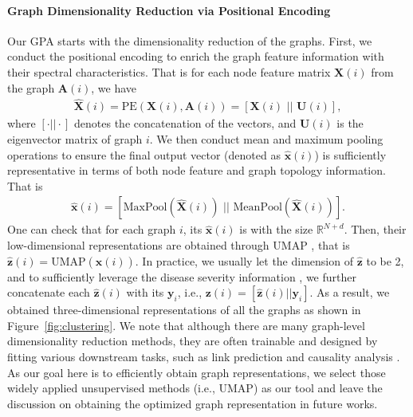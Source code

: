 \documentclass{article} %
\begin{document}
\paragraph{Graph Dimensionality Reduction via Positional Encoding}
Our GPA starts with the dimensionality reduction of the graphs. First, we conduct the positional encoding to enrich the graph feature information with their spectral characteristics. That is for each node feature matrix $\mathbf X(i)$ from the graph $\mathbf A(i)$, we have 
\begin{align}
    \widehat{\mathbf X}(i) = \mathrm{PE}(\mathbf X(i), \mathbf A(i)) = [\mathbf X(i) \,\, || \,\, \mathbf U(i)],
\end{align}
where $[\cdot || \cdot]$ denotes the concatenation of the vectors, and $\mathbf U(i)$ is the eigenvector matrix of graph $i$. We then conduct mean and maximum pooling operations to ensure the final output vector (denoted as $\widehat{\mathbf x}(i)$) is sufficiently representative in terms of both node feature and graph topology information. That is  
\begin{align}
    \widehat{\mathbf x}(i) = [\mathrm{MaxPool}(\widehat{\mathbf X}(i)) \,\, || \,\, \mathrm{MeanPool}(\widehat{\mathbf X}(i))].
\end{align}
One can check that for each graph $i$, its $\widehat{\mathbf x}(i)$ is with the size $\mathbb R^{N+d}$. Then, their low-dimensional representations are obtained through UMAP \citep{mcinnes2018umap}, that is $\widehat{\mathbf z}(i) = \mathrm{UMAP}(\widehat{\mathbf x}(i))$. In practice, we usually let the dimension of $\widehat{\mathbf z}$ to be 2, and to sufficiently leverage the disease severity information \citep{shi2024design}, we further concatenate each $\widehat{\mathbf z} (i)$ with its $\mathbf y_i$, i.e., $\mathbf z(i) = [\widehat{\mathbf z}(i) || \mathbf y_i]$. As a result, we obtained three-dimensional representations of all the graphs as shown in Figure~\ref{fig:clustering}. We note that although there are many graph-level dimensionality reduction methods, they are often trainable and designed by fitting various downstream tasks, such as link prediction \citep{kipf2016variational} and causality analysis \citep{ng2019graph}. As our goal here is to efficiently obtain graph representations, we select those widely applied unsupervised methods (i.e., UMAP) as our tool and leave the discussion on obtaining the optimized graph representation in future works. 
\end{document}
